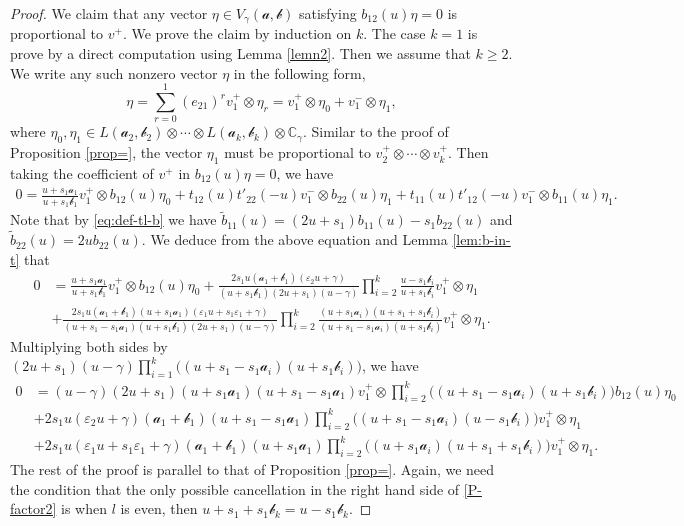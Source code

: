 \documentclass[11pt,reqno]{amsart}
\numberwithin{equation}{section}
\theoremstyle{definition}
\theoremstyle{remark}
\newcommand{\mc}{\mathcal}
\newcommand{\bC}{\mathbb{C}}
\newcommand{\tl}{\tilde}
\newcommand{\gge}{\geqslant}
\newcommand{\ve}{\varepsilon}
\begin{document}
\begin{proof}
We claim that any vector $\eta\in V_{\gamma}(\bm{\mc a,\mc b})$ satisfying $b_{12}(u)\eta=0$ is proportional to $v^+$. We prove the claim by induction on $k$. The case $k=1$ is prove by a direct computation using Lemma \ref{lemn2}. Then we assume that $k\gge 2$. We write any such nonzero vector $\eta$ in the following form,
\[
\eta=\sum_{r=0}^1 (e_{21})^rv_1^+\otimes\eta_r=v_1^+\otimes \eta_0+v_1^-\otimes \eta_1,
\]
where $\eta_0,\eta_1\in L(\mc a_2,\mc b_2)\otimes \cdots\otimes L(\mc a_k,\mc b_k)\otimes\bC_\gamma$. Similar to the proof of Proposition \ref{prop=}, the vector $\eta_1$ must be proportional to $v_2^+\otimes\cdots\otimes v_k^+$. Then taking the coefficient of $v^+$ in $b_{12}(u)\eta=0$, we have
\begin{align*}
0=\frac{u+s_1\mc a_1}{u+s_1\mc b_1}v_1^+\otimes b_{12}(u)\eta_0+t_{12}(u)t'_{22}(-u)v_1^-\otimes b_{22}(u)\eta_1+t_{11}(u)t'_{12}(-u)v_1^-\otimes b_{11}(u)\eta_1.
\end{align*}
Note that by \eqref{eq:def-tl-b} we have $\tl b_{11}(u)=(2u+s_1)b_{11}(u)-s_1b_{22}(u)$ and $\tl b_{22}(u)=2ub_{22}(u)$. We deduce from the above equation and Lemma \ref{lem:b-in-t} that
\begin{align*}
0&=\frac{u+s_1\mc a_1}{u+s_1\mc b_1}v_1^+\otimes b_{12}(u)\eta_0+\frac{2s_1u(\mc a_1+\mc b_1)(\ve_2u+\gamma)}{(u+s_1\mc b_1)(2u+s_1)(u-\gamma)}\prod_{i=2}^k\frac{u-s_1\mc b_i}{u+s_1\mc b_i} v_1^+\otimes \eta_1 \\
&+\frac{2s_1u(\mc a_1+\mc b_1)(u+s_1\mc a_1)(\ve_1u+s_1\ve_1+\gamma)}{(u+s_1-s_1\mc a_1)(u+s_1\mc b_1)(2u+s_1)(u-\gamma)}\prod_{i=2}^k\frac{(u+s_1\mc a_i)(u+s_1+s_1\mc b_i)}{(u+s_1-s_1\mc a_i)(u+s_1\mc b_i)} v_1^+\otimes \eta_1.
\end{align*}
Multiplying both sides by $(2u+s_1)(u-\gamma)\prod_{i=1}^k\big((u+s_1-s_1\mc a_i)(u+s_1\mc b_i)\big)$, we have
\begin{align*}
0&=(u-\gamma)(2u+s_1)(u+s_1\mc a_1)(u+s_1-s_1\mc a_1)v_1^+\otimes \prod_{i=2}^k\big((u+s_1-s_1\mc a_i)(u+s_1\mc b_i)\big)b_{12}(u)\eta_0\\
&+2s_1u(\ve_2u+\gamma)(\mc a_1+\mc b_1)(u+s_1-s_1\mc a_1)\prod_{i=2}^k\big((u+s_1-s_1\mc a_i)(u-s_1\mc b_i)\big) v_1^+\otimes \eta_1 \\
&+2s_1u(\ve_1u+s_1\ve_1+\gamma)(\mc a_1+\mc b_1)(u+s_1\mc a_1)\prod_{i=2}^k\big((u+s_1\mc a_i)(u+s_1+s_1\mc b_i)\big) v_1^+\otimes \eta_1.
\end{align*}
The rest of the proof is parallel to that of Proposition \ref{prop=}. Again, we need the condition that the only possible cancellation in the right hand side of \eqref{P-factor2} is when $l$ is even, then $u+s_1+s_1\mc b_k=u-s_1\mc b_k$.
\end{proof}
\end{document}
